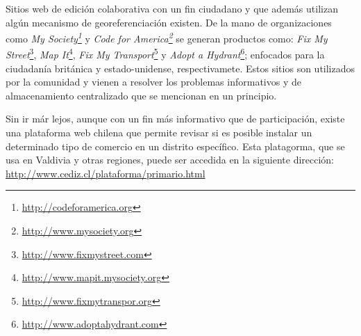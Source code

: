 \documentclass[12pt]{article}
\begin{document}
Sitios web de edición colaborativa con un fin ciudadano y que además utilizan
algún mecanismo de georeferenciación existen. De la mano de organizaciones como
\emph{My Society\footnote{\url{http://codeforamerica.org}}} y \emph{Code for
America\footnote{\url{http://www.mysociety.org}}} se generan productos como: \emph{Fix
My Street}\footnote{\url{http://www.fixmystreet.com}}, \emph{Map
It}\footnote{\url{http://www.mapit.mysociety.org}}, \emph{Fix My
Transport}\footnote{\url{http://www.fixmytranspor.org}} y \emph{Adopt a
Hydrant}\footnote{\url{http://www.adoptahydrant.com}}; enfocados para la
ciudadanía británica y estado-unidense, respectivamete.
Estos sitios son utilizados por la comunidad y vienen a resolver los problemas
informativos y de almacenamiento centralizado que se mencionan en un principio.

Sin ir már lejos, aunque con un fin más informativo que de participación, existe
una plataforma web chilena que permite revisar si es posible instalar un
determinado tipo de comercio en un distrito específico. 
Esta platagorma, que se usa en Valdivia y otras regiones, puede ser accedida en la siguiente
dirección: \url {http://www.cediz.cl/plataforma/primario.html}
\end{document}
